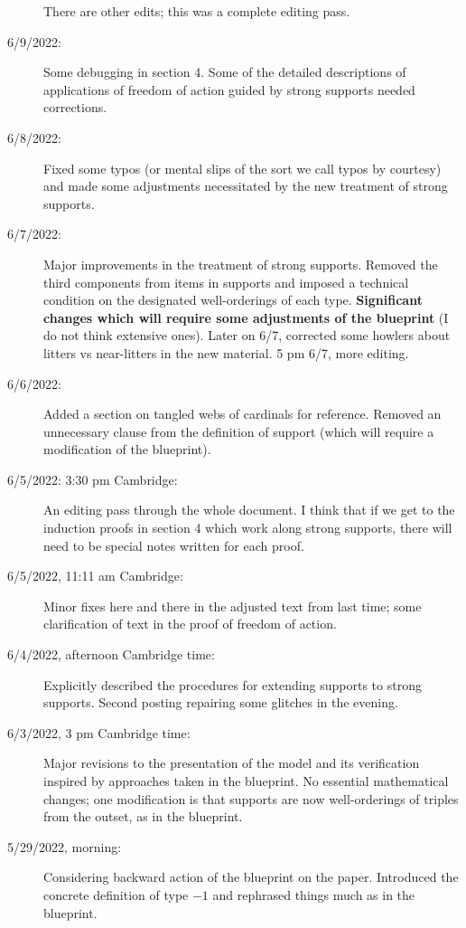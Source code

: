 \documentclass[112pt]{article}
\begin{document}
\begin{description}
There are other edits;  this was a complete editing pass.

\item[6/9/2022:]  Some debugging in section 4.  Some of the detailed descriptions of applications of freedom of action guided by strong supports needed corrections.  

\item[6/8/2022:]  Fixed some typos (or mental slips of the sort we call typos by courtesy) and made some adjustments necessitated by the new treatment of strong supports.

\item[6/7/2022:]  Major improvements in the treatment of strong supports.  Removed the third components from items in supports and imposed a technical condition on the designated well-orderings of each type.  {\bf Significant changes which will require some adjustments of the blueprint} (I do not think extensive ones).  Later on 6/7, corrected some howlers about litters vs near-litters in the new material.  5 pm 6/7, more editing.

\item[6/6/2022:]  Added a section on tangled webs of cardinals for reference.  Removed an unnecessary clause from the definition of support (which will require a modification of the blueprint).

\item[6/5/2022:  3:30 pm Cambridge:]  An editing pass through the whole document.  I think that if we get to the induction proofs in section 4 which work along strong supports, there will need to be special notes written for each proof.

\item[6/5/2022, 11:11 am Cambridge:]  Minor fixes here and there in the adjusted text from last time;  some clarification of text in the proof of freedom of action.

\item[6/4/2022, afternoon Cambridge time:]  Explicitly described the procedures for extending supports to strong supports.  Second posting repairing some glitches in the evening.

\item[6/3/2022, 3 pm Cambridge time:]  Major revisions to the presentation of the model and its verification inspired by approaches taken in the blueprint.  No essential mathematical changes;  one modification is that supports are now well-orderings of triples from the outset, as in the blueprint.

\item[5/29/2022, morning:]  Considering backward action of the blueprint on the paper.  Introduced the concrete definition of type $-1$ and rephrased things much as in the blueprint.


\end{description}
\end{document}
